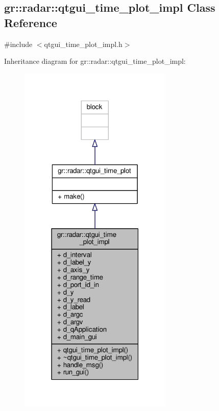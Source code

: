 \subsection{gr\+:\+:radar\+:\+:qtgui\+\_\+time\+\_\+plot\+\_\+impl Class Reference}
\label{classgr_1_1radar_1_1qtgui__time__plot__impl}


{\ttfamily \#include $<$qtgui\+\_\+time\+\_\+plot\+\_\+impl.\+h$>$}



Inheritance diagram for gr\+:\+:radar\+:\+:qtgui\+\_\+time\+\_\+plot\+\_\+impl\+:
\nopagebreak
\begin{figure}[H]
\begin{center}
\leavevmode
\includegraphics[width=207pt]{d7/d03/classgr_1_1radar_1_1qtgui__time__plot__impl__inherit__graph}
\end{center}
\end{figure}


